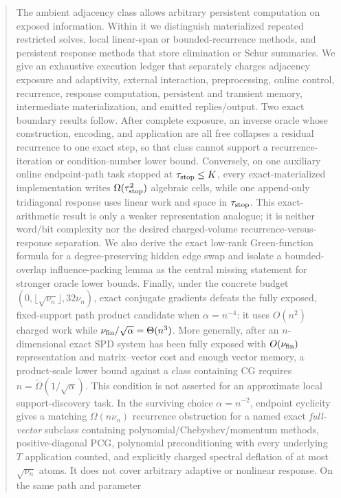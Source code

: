 \documentclass[11pt]{article}
\begin{document}
\begin{abstract}
The ambient adjacency class allows arbitrary persistent computation on
exposed information.  Within it we distinguish materialized repeated
restricted solves, local linear-span or bounded-recurrence methods, and
persistent response methods that store elimination or Schur summaries.  We
give an exhaustive execution ledger that separately charges adjacency
exposure and adaptivity, external interaction, preprocessing, online control,
recurrence, response computation, persistent and transient memory,
intermediate materialization, and emitted replies/output.  Two exact boundary
results follow.  After complete exposure, an inverse oracle whose construction,
encoding, and application are all free collapses a residual recurrence to one
exact step, so that class cannot support a recurrence-iteration or
condition-number lower bound.  Conversely, on one auxiliary online
endpoint-path task stopped at $\tau_{\rm stop}\leq K$, every exact-materialized
implementation writes $\Omega(\tau_{\rm stop}^2)$ algebraic cells, while one
append-only tridiagonal response uses linear work and space in
$\tau_{\rm stop}$.  This exact-arithmetic result is only a weaker
representation analogue; it is neither word/bit complexity nor the desired
charged-volume recurrence-versus-response separation.  We also derive the exact
low-rank Green-function formula for a degree-preserving hidden edge swap and
isolate a bounded-overlap influence-packing lemma as the central missing
statement for stronger oracle lower bounds.  Finally, under the concrete
budget $(0,\lfloor\sqrt{\nu_n}\rfloor,32\nu_n)$, exact
conjugate gradients defeats the fully exposed, fixed-support path product
candidate when
$\alpha=n^{-4}$: it uses $O(n^2)$ charged work while
$\nu_{\rm fin}/\sqrt\alpha=\Theta(n^3)$.  More generally, after an
$n$-dimensional exact SPD system has been fully exposed with
$O(\nu_{\rm fin})$ representation and matrix--vector cost and enough vector
memory, a product-scale lower bound against a class containing CG requires
$n=\widetilde\Omega(1/\sqrt\alpha)$.  This condition is not asserted for an
approximate local support-discovery task.  In the surviving choice
$\alpha=n^{-2}$, endpoint cyclicity gives a matching
$\Omega(n\nu_n)$ recurrence obstruction for a named exact \emph{full-vector}
subclass containing
polynomial/Chebyshev/momentum methods, positive-diagonal PCG, polynomial
preconditioning with every underlying $T$ application counted, and explicitly
charged spectral deflation of at most $\sqrt{\nu_n}$ atoms.  It does not cover
arbitrary adaptive or nonlinear response.  On the same path and parameter

\end{abstract}
\end{document}
